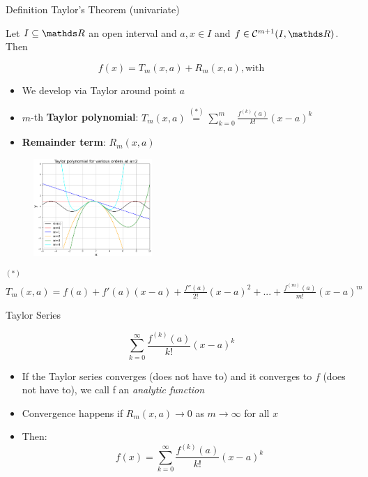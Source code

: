 \documentclass[11pt,compress,t,notes=noshow, xcolor=table]{beamer}
\begin{document}
\begin{vbframe}{Definition Taylor's Theorem (univariate)}

\vspace*{-0.1cm}

Let $I \subseteq \R$ an open interval and $a, x \in I$ and $f \in \mathcal{C}^{m+1}(I,\R)$. Then 

\vspace*{-0.1cm}

$$f(x) = T_{m}(x,a) + R_{m}(x,a), \text{with}$$ 


    \begin{itemize}
      \item We develop via Taylor around point $a$
      \item $m$-th \textbf{Taylor polynomial}: $T_{m}(x,a) \overset{(*)}{=} \sum_{k=0}^{m} \frac{f^{(k)}(a)}{k!}(x-a)^{k}$ 
      \item \textbf{Remainder term}: $R_m(x, a)$ %
    \end{itemize}

\vspace*{-0.3cm}

    \begin{figure}[htp]
        \centering
        \includegraphics[width=0.4\textwidth]{figure_man/taylor_univariate.png}
    \end{figure}

    \begin{footnotesize}
      $^{(*)}$ $T_{m}(x,a) = f(a) + f'(a)(x-a) + \frac{f''(a)}{2!}(x-a)^{2} + ... + \frac{f^{(m)}(a)}{m!} (x - a)^m$
    \end{footnotesize}

    
\end{vbframe}

\begin{vbframe}{Taylor Series}

$$\sum_{k=0}^{\infty} \frac{f^{(k)}(a)}{k!}(x-a)^{k} $$

\vspace*{2cm}

    \begin{itemize}
      \item If the Taylor series converges (does not have to) and it converges to $f$ (does not  have to), we call f an \emph{analytic function}
      \item Convergence happens if $R_m(x, a) \rightarrow 0$ as $m \rightarrow \infty$ for all $x$
      \item Then:
$$f(x) = \sum_{k=0}^{\infty} \frac{f^{(k)}(a)}{k!}(x-a)^{k} $$
    \end{itemize}
    
\end{vbframe}
\end{document}
